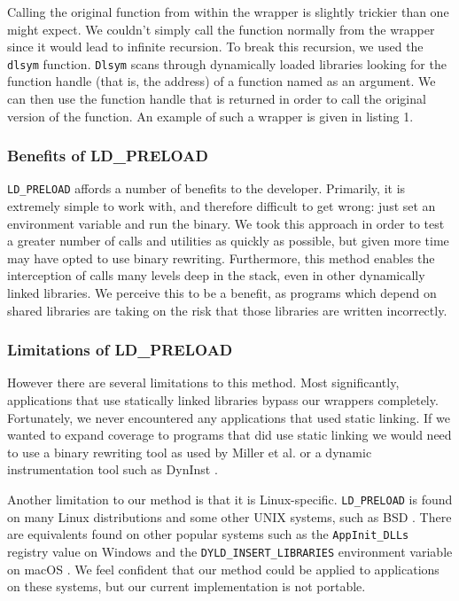 Calling the original function from within the wrapper is slightly trickier than one might expect. We couldn't simply call the function normally from the wrapper since it would lead to infinite recursion. To break this recursion, we used the \texttt{dlsym} function. \texttt{Dlsym} scans through dynamically loaded libraries looking for the function handle (that is, the address) of a function named as an argument. We can then use the function handle that is returned in order to call the original version of the function. An example of such a wrapper is given in listing 1.

\begin{minipage}{\linewidth} %
	
\end{minipage}

\subsubsection{Benefits of LD\_PRELOAD}
\texttt{LD\_PRELOAD} affords a number of benefits to the developer. Primarily, it is extremely simple to work with, and therefore difficult to get wrong: just set an environment variable and run the binary. We took this approach in order to test a greater number of calls and utilities as quickly as possible, but given more time may have opted to use binary rewriting. Furthermore, this method enables the interception of calls many levels deep in the stack, even in other dynamically linked libraries. We perceive this to be a benefit, as programs which depend on shared libraries are taking on the risk that those libraries are written incorrectly.

\subsubsection{Limitations of LD\_PRELOAD}
However there are several limitations to this method. Most significantly, applications that use statically linked libraries bypass our wrappers completely. Fortunately, we never encountered any applications that used static linking. If we wanted to expand coverage to programs that did use static linking we would need to use a binary rewriting tool as used by Miller et al. \cite{bart} or a dynamic instrumentation tool such as DynInst \cite{dyninst}.

Another limitation to our method is that it is Linux-specific. \texttt{LD\_PRELOAD} is found on many Linux distributions and some other UNIX systems, such as BSD \cite{bsd}. There are equivalents found on other popular systems such as the \texttt{AppInit\_DLLs} registry value on Windows \cite{dll} and the \texttt{DYLD\_INSERT\_LIBRARIES} environment variable on macOS \cite{macos}. We feel confident that our method could be applied to applications on these systems, but our current implementation is not portable.


